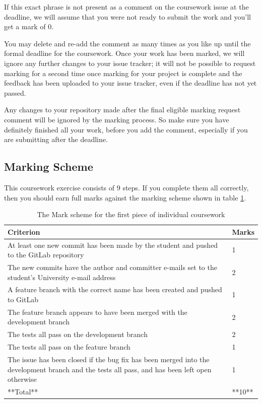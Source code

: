 \documentclass[
]{book}
\begin{document}
If this exact phrase is not present as a comment on the coursework issue at the deadline, we will assume that you were not ready to submit the work and you'll get a mark of 0.

You may delete and re-add the comment as many times as you like up until the formal deadline for the coursework. Once your work has been marked, we will ignore any further changes to your issue tracker; it will not be possible to request marking for a second time once marking for your project is complete and the feedback has been uploaded to your issue tracker, even if the deadline has not yet passed.

Any changes to your repository made after the final eligible marking request comment will be ignored by the marking process. So make sure you have definitely finished all your work, before you add the comment, especially if you are submitting after the deadline.

\hypertarget{markingscheme}{%
\subsection{Marking Scheme}\label{markingscheme}}

This coursework exercise consists of 9 steps. If you complete them all correctly, then you should earn full marks against the marking scheme shown in table \ref{tab:marktable}.

\begin{table}

\caption{\label{tab:marktable}The Mark scheme for the first piece of individual coursework}
\centering
\begin{tabular}[t]{ll}
\toprule
Criterion & Marks\\
\midrule
At least one new commit has been made by the student and pushed to the GitLab repository & 1\\
The new commits have the author and committer e-mails set to the student's University e-mail address & 2\\
A feature branch with the correct name has been created and pushed to GitLab & 1\\
The feature branch appears to have been merged with the development branch & 2\\
The tests all pass on the development branch & 2\\
\addlinespace
The tests all pass on the feature branch & 1\\
The issue has been closed if the bug fix has been merged into the development branch and the tests all pass, and has been left open otherwise & 1\\
**Total** & **10**\\
\bottomrule
\end{tabular}
\end{table}
\end{document}
